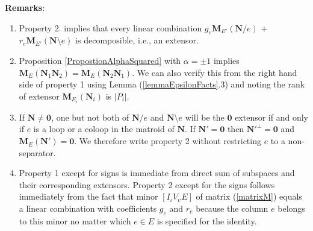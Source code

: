 \documentclass[12pt]{article}
\theoremstyle{definition}
\newcommand{\Remarks}{\textbf{Remarks}}
\newcommand{\Is}{\ensuremath{\iota}}
\newcommand{\Vs}{\ensuremath{\upsilon}}
\newcommand{\Card}[1]{\ensuremath{{\left|#1\right|}}}
\newcommand{\ext}[1]{\ensuremath{\mathbf{#1}}}
\begin{document}
\Remarks:  
\begin{enumerate}
\item 
Property 2. implies that every
linear combination $g_e\ext{M}_{E'}(\ext{N}/e)$ $+$
$r_e\ext{M}_{E'}(\ext{N}\setminus e)$ is decomposible, i.e., an 
extensor.
\item Proposition \ref{PropostionAlphaSquared} with $\alpha=\pm 1$
implies $\ext{M}_E(\ext{N}_1\ext{N}_2)=\ext{M}_E(\ext{N}_2\ext{N}_1)$.  
We can also verify this from the right hand side of 
property 1 using Lemma (\ref{lemmaEpsilonFacts}.3) and noting the rank of
extensor $\ext{M}_{E_i}(\ext{N}_i)$ is $\Card{P_i}$.
\item
If $\ext{N}\neq \ext{0}$, 
one but not both of $\ext{N}/e$ and $\ext{N}\setminus e$ 
will
be the $\ext{0}$ extensor 
if and only if $e$ is a loop or a coloop in the matroid of $\ext{N}$.
If $\ext{N}'=\ext{0}$ then $\ext{N}'^{\perp}=\ext{0}$ and 
$\ext{M}_E(\ext{N}')=\ext{0}$.
We therefore write property 2 without restricting $e$ to a non-separator.
\item Property 1 except for signs is immediate from direct sum of 
subspaces and their corresponding extensors.  Property 2 except for the
signs
follows immediately 
from the fact that minor $[I_{\Is}V_{\Vs}E]$ of matrix (\ref{matrixM})
equals a linear combination with coefficients $g_e$ and $r_e$
because 
the column $e$ belongs to this minor
no matter which $e\in E$ is specified 
for the identity.
\end{enumerate}
\end{document}
